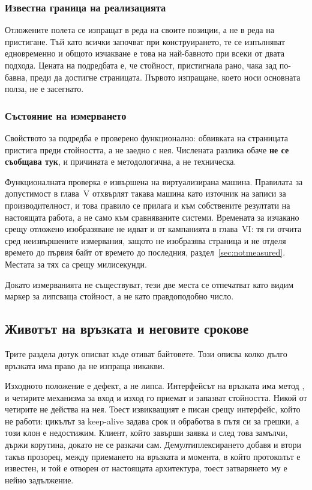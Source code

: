 \subsubsection{Известна граница на реализацията}

Отложените полета се изпращат в реда на своите позиции, а не в реда на пристигане. Тъй
като всички започват при конструирането, те се изпълняват едновременно и общото изчакване
е това на най-бавното при всеки от двата подхода. Цената на подредбата е, че стойност,
пристигнала рано, чака зад по-бавна, преди да достигне страницата. Първото изпращане, което
носи основната полза, не е засегнато.

\subsubsection{Състояние на измерването}

Свойството за подредба е проверено функционално: обвивката на страницата пристига преди
стойността, а не заедно с нея. Числената разлика обаче \textbf{не се съобщава тук}, и
причината е методологична, а не техническа.

Функционалната проверка е извършена на виртуализирана машина. Правилата за допустимост в
глава~V отхвърлят такава машина като източник на записи за производителност, и това правило
се прилага и към собствените резултати на настоящата работа, а не само към сравняваните
системи. Времената за изчакано срещу отложено изобразяване не идват и от кампанията в
глава~VI: тя ги отчита сред неизвършените измервания, защото  не изобразява
страница и не отделя времето до първия байт от времето до последния,
раздел~\ref{sec:notmeasured}. Местата за тях са  срещу
 милисекунди.

Докато измерванията не съществуват, тези две места се отпечатват като видим маркер за
липсваща стойност, а не като правдоподобно число.

\subsection{Животът на връзката и неговите срокове}
\label{sec:deadlines}

Трите раздела дотук описват къде отиват байтовете. Този описва колко дълго връзката има
право да не изпраща никакви.

Изходното положение е дефект, а не липса. Интерфейсът на връзката има метод
, и четирите механизма за вход и изход го приемат и запазват стойността.
Никой от четирите не действа на нея. Тоест извикващият е писан срещу интерфейс, който не
работи: цикълът за keep-alive задава срок и обработва  в пътя си
за грешки, а този клон е недостижим. Клиент, който завърши заявка и след това замълчи,
държи корутина, докато не се разкачи сам. Демултиплексирането добавя и втори такъв
прозорец, между приемането на връзката и момента, в който протоколът е известен, и той е
отворен от настоящата архитектура, тоест затварянето му е нейно задължение.

